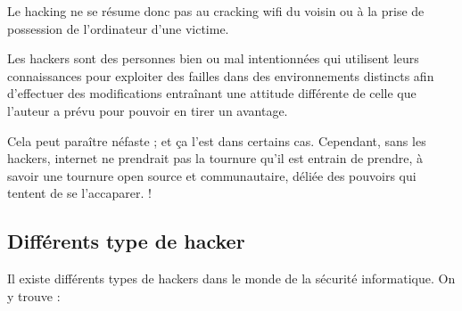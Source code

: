     Le hacking ne se résume donc pas au cracking wifi du voisin ou à la prise de possession de l'ordinateur 
    d'une victime.

    Les hackers sont des personnes bien ou mal intentionnées qui utilisent leurs connaissances pour exploiter 
    des failles dans des environnements distincts afin d'effectuer des modifications entraînant une attitude 
    différente de celle que l'auteur a prévu pour pouvoir en tirer un avantage.

    Cela peut paraître néfaste ; et ça l'est dans certains cas. Cependant, sans les hackers, internet ne prendrait 
    pas la tournure qu'il est entrain de prendre, à savoir une tournure open source et communautaire, 
    déliée des pouvoirs qui tentent de se l'accaparer. \cite{hacking} ! 

    \subsection{Différents type de hacker}
    Il existe différents types de hackers dans le monde de la sécurité informatique. On y trouve : 
    \cite{types_de_hacker}

